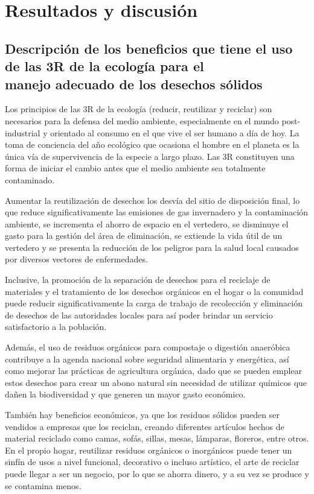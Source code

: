 \vspace*{6cm}
\chapter{Resultados y discusión}
\newpage

\section{Descripción de los beneficios que tiene el uso de las 3R de la ecología para el \\[6pt]manejo adecuado de los desechos sólidos}

Los principios de las 3R de la ecología (reducir, reutilizar y reciclar) son necesarios para la defensa del medio ambiente, especialmente en el mundo post-industrial y orientado al consumo en el que vive el ser humano a día de hoy. La toma de conciencia del año ecológico que ocasiona el hombre en el planeta es la única vía de supervivencia de la especie a largo plazo. Las 3R constituyen una forma de iniciar el cambio antes que el medio ambiente sea totalmente contaminado.

Aumentar la reutilización de desechos los desvía del sitio de disposición final, lo que reduce significativamente las emisiones de gas invernadero y la contaminación ambiente, se incrementa el ahorro de espacio en el vertedero, se disminuye el gasto para la gestión del área de eliminación, se extiende la vida útil de un vertedero y se presenta la reducción de los peligros para la salud local causados por diversos vectores de enfermedades.

Inclusive, la promoción de la separación de desechos para el reciclaje de materiales y el tratamiento de los desechos orgánicos en el hogar o la comunidad puede reducir significativamente la carga de trabajo de recolección y eliminación de desechos de las autoridades locales para así poder brindar un servicio satisfactorio a la población.   

Además, el uso de residuos orgánicos para compostaje o digestión anaeróbica contribuye a la agenda nacional sobre seguridad alimentaria y energética, así como mejorar las prácticas de agricultura orgánica, dado que se pueden emplear estos desechos para crear un abono natural sin necesidad de utilizar químicos que dañen la biodiversidad y que generen un mayor gasto económico.

También hay beneficios económicos, ya que los residuos sólidos pueden ser vendidos a empresas que los reciclan, creando diferentes artículos hechos de material reciclado como camas, sofás, sillas, mesas, lámparas, floreros, entre otros. En el propio hogar, reutilizar residuos orgánicos o inorgánicos puede tener un sinfín de usos a nivel funcional, decorativo o incluso artístico, el arte de reciclar puede llegar a ser un negocio, por lo que se ahorra dinero, y a su vez se produce y se contamina menos.

